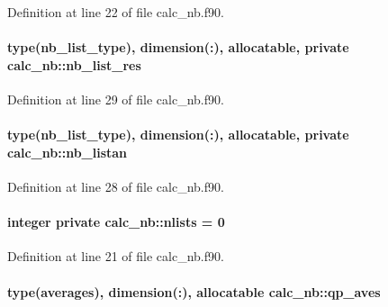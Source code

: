 Definition at line 22 of file calc\-\_\-nb.\-f90.

\hypertarget{classcalc__nb_a0f1fd0b4399b22ef787aa8a3c9276ebb}{
\paragraph[{nb\-\_\-list\-\_\-res}]{\setlength{\rightskip}{0pt plus 5cm}type({\bf nb\-\_\-list\-\_\-type}), dimension(\-:), allocatable, private calc\-\_\-nb\-::nb\-\_\-list\-\_\-res\hspace{0.3cm}{\ttfamily [private]}}}\label{classcalc__nb_a0f1fd0b4399b22ef787aa8a3c9276ebb}


Definition at line 29 of file calc\-\_\-nb.\-f90.

\hypertarget{classcalc__nb_a154f77fd66aa211714c4de1ecf541bd3}{
\paragraph[{nb\-\_\-listan}]{\setlength{\rightskip}{0pt plus 5cm}type({\bf nb\-\_\-list\-\_\-type}), dimension(\-:), allocatable, private calc\-\_\-nb\-::nb\-\_\-listan\hspace{0.3cm}{\ttfamily [private]}}}\label{classcalc__nb_a154f77fd66aa211714c4de1ecf541bd3}


Definition at line 28 of file calc\-\_\-nb.\-f90.

\hypertarget{classcalc__nb_a2ca020a3bfebca620427efddfdf4b9a7}{
\paragraph[{nlists}]{\setlength{\rightskip}{0pt plus 5cm}integer private calc\-\_\-nb\-::nlists = 0\hspace{0.3cm}{\ttfamily [private]}}}\label{classcalc__nb_a2ca020a3bfebca620427efddfdf4b9a7}


Definition at line 21 of file calc\-\_\-nb.\-f90.

\hypertarget{classcalc__nb_a8f4b9b4a7f6179d3b4284f88af41c5ae}{
\paragraph[{qp\-\_\-aves}]{\setlength{\rightskip}{0pt plus 5cm}type({\bf averages}), dimension(\-:), allocatable calc\-\_\-nb\-::qp\-\_\-aves}}\label{classcalc__nb_a8f4b9b4a7f6179d3b4284f88af41c5ae}



